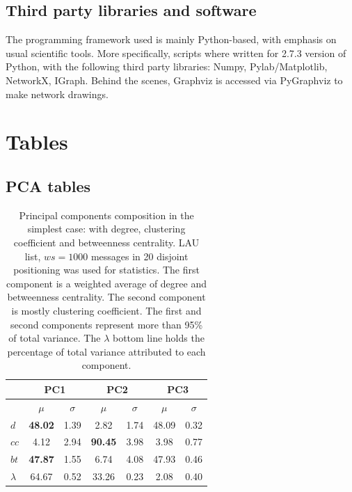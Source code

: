 \documentclass[%
 aip,
 jmp,%
 amsmath,amssymb,
 reprint,%
]{revtex4-1}
\begin{document}
\subsection{Third party libraries and software}
The programming framework used 
is mainly Python-based, with emphasis on usual
scientific tools. More specifically,
scripts where written for 2.7.3 version of Python,
with the following third party libraries: Numpy, Pylab/Matplotlib, NetworkX, IGraph.
Behind the scenes, Graphviz is accessed via PyGraphviz to make network drawings.
\clearpage
\section{Tables}\label{sectables}
\subsection{PCA tables}\label{sec:pcat}
\begin{table}[!h]
  \centering
  \caption{Principal components composition in the simplest case: with degree, clustering coefficient and betweenness centrality. LAU list, $ws=1000$ messages in 20 disjoint positioning was used for statistics. The first component is a weighted average of degree and betweenness centrality. The second component is mostly clustering coefficient. The first and second components represent more than 95\% of total variance. The $\lambda$ bottom line holds the percentage of total variance attributed to each component.}
  \begin{tabular}{|l|c|c| c|c| c|c|}\hline
 & \multicolumn{2}{c|}{PC1}          & \multicolumn{2}{c|}{PC2} & \multicolumn{2}{c|}{PC3}  \\\hline
       & $\mu$            & $\sigma$ & $\mu$         & $\sigma$ & $\mu$ & $\sigma$  \\\hline
$d$       & {\bf 48.02}   & 1.39     & 2.82          & 1.74     & 48.09  & 0.32 \\
$cc$      & 4.12          & 2.94     & {\bf 90.45}   & 3.98     & 3.98  & 0.77 \\ 
$bt$      & {\bf 47.87}   & 1.55     & 6.74          & 4.08     & 47.93 & 0.46 \\ \hline
$\lambda$ & 64.67         & 0.52     & 33.26         & 0.23     & 2.08  & 0.40 \\ \hline
  \end{tabular}
  \label{compPCA0}
\end{table}
\end{document}
